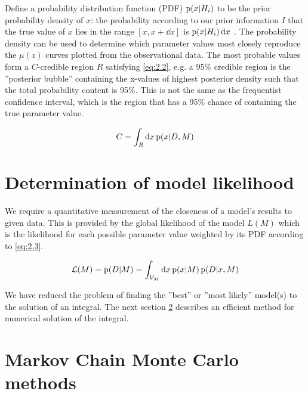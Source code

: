 Define a probability distribution function (PDF) $\prob{x}[H_i]$ to be the prior probability density of $x$: the probability according to our prior information $I$ that the true value of $x$ lies in the range $[x, x + \dd{x}]$ is $\prob{x}[H_i] \dd{x}$ \cite{Gregory2005}. The probability density can be used to determine which parameter values most closely reproduce the $\mu(z)$ curves plotted from the observational data. The most probable values form a $C$-credible region $R$ satisfying \cref{eq:2.2}, e.g. a 95\% credible region is the ”posterior bubble” containing the x-values of highest posterior density such that the total probability content is 95\%. This is not the same as the frequentist confidence interval, which is the region that has a 95\% chance of containing the true parameter value.
 
\begin{equation}
    C = \int_{R} \dd{x} \prob{x}[D,M]
\label{eq:2.2}
\end{equation}

\section{Determination of model likelihood}
\label{sec:2.2}

We require a quantitative measurement of the closeness of a model’s results to given data. This is provided by the global likelihood of the model $L(M)$ which is the likelihood for each possible parameter value weighted by its PDF according to \cref{eq:2.3}.

\begin{equation}
    \mathcal{L} (M) 
    = \prob{D}[M]
    = \int_{V_{M}} \dd{x} \prob{x}[M] \prob{D}[x,M]
\label{eq:2.3}
\end{equation}

We have reduced the problem of finding the ”best” or ”most likely” model(s) to the solution of an integral. The next section \cref{sec:2.3} describes an efficient method for numerical solution of the integral.

\section{Markov Chain Monte Carlo methods}
\label{sec:2.3}

